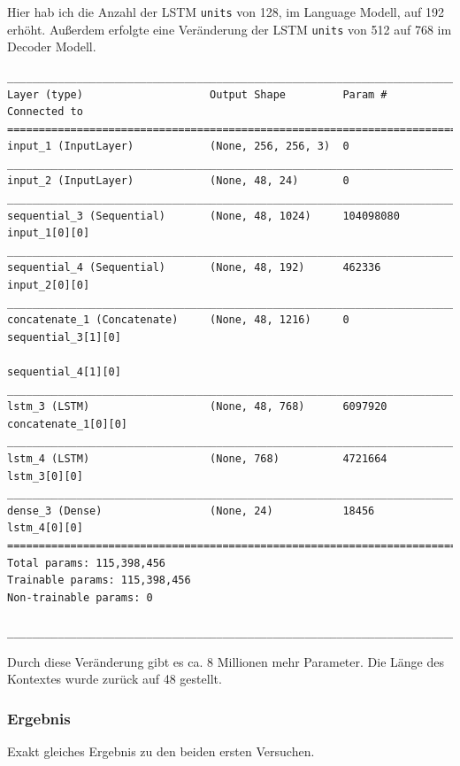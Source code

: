 \documentclass[pdftex,a4paper,halfparskip, article]{scrartcl}
\begin{document}
Hier hab ich die Anzahl der LSTM \texttt{units} von 128, im Language Modell, auf 192 erhöht. Außerdem erfolgte eine Veränderung der LSTM \texttt{units} von 512 auf 768 im Decoder Modell.

\begin{verbatim}
________________________________________________________________________________
Layer (type)                    Output Shape         Param #     Connected to
================================================================================
input_1 (InputLayer)            (None, 256, 256, 3)  0
________________________________________________________________________________
input_2 (InputLayer)            (None, 48, 24)       0
________________________________________________________________________________
sequential_3 (Sequential)       (None, 48, 1024)     104098080   input_1[0][0]
________________________________________________________________________________
sequential_4 (Sequential)       (None, 48, 192)      462336      input_2[0][0]
________________________________________________________________________________
concatenate_1 (Concatenate)     (None, 48, 1216)     0           sequential_3[1][0]
                                                                 sequential_4[1][0]
________________________________________________________________________________
lstm_3 (LSTM)                   (None, 48, 768)      6097920     concatenate_1[0][0]
________________________________________________________________________________
lstm_4 (LSTM)                   (None, 768)          4721664     lstm_3[0][0]
________________________________________________________________________________
dense_3 (Dense)                 (None, 24)           18456       lstm_4[0][0]
================================================================================
Total params: 115,398,456
Trainable params: 115,398,456
Non-trainable params: 0

________________________________________________________________________________
\end{verbatim}

Durch diese Veränderung gibt es ca. 8 Millionen mehr Parameter.
Die Länge des Kontextes wurde zurück auf 48 gestellt.

\subsubsection*{Ergebnis}

Exakt gleiches Ergebnis zu den beiden ersten Versuchen.
\end{document}
